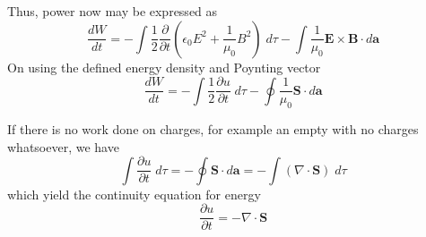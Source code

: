 \documentclass[../../../main.tex]{subfiles}
\begin{document}
Thus, power now may be expressed as 
\begin{equation*}
   \frac{dW}{dt}=-\int\frac{1}{2}\frac{\partial}{\partial t}\left(\epsilon_0E^2+\frac{1}{\mu_0}B^2\right)\;d\tau -\int\frac{1}{\mu_0}\mathbf{E}\times\mathbf{B}\cdot d\mathbf{a}
\end{equation*}
On using the defined energy density and Poynting vector
\begin{equation*}
    \frac{dW}{dt}=-\int\frac{1}{2}\frac{\partial u}{\partial t}\;d\tau -\oint\frac{1}{\mu_0}\mathbf{S}\cdot d\mathbf{a} 
\end{equation*}

If there is no work done on charges, for example an empty with no charges whatsoever, we have 
\begin{equation*}
    \int \frac{\partial u}{\partial t}\;d\tau=-\oint \mathbf{S}\cdot d\mathbf{a}= -\int(\nabla\cdot\mathbf{S})\;d\tau
\end{equation*}
which yield the continuity equation for energy 
\begin{equation*}
    \frac{\partial u}{\partial t}=-\nabla\cdot\mathbf{S}
\end{equation*}
\end{document}
